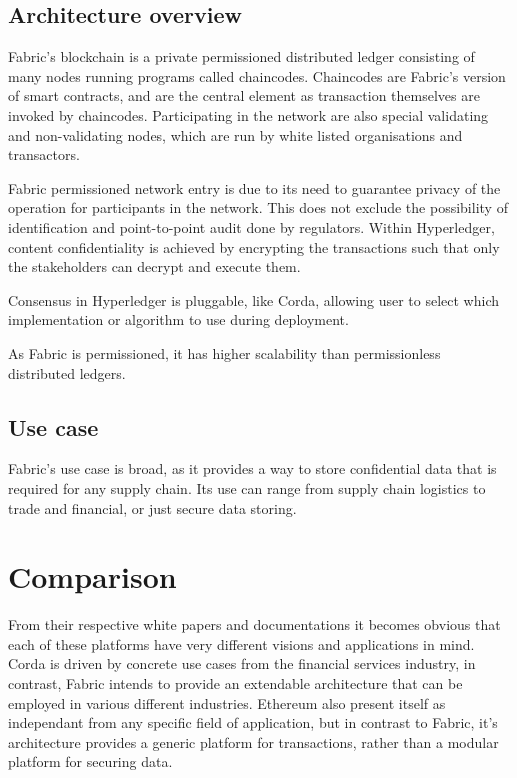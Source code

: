 \subsection{Architecture overview}

Fabric's blockchain is a private permissioned distributed ledger consisting of many nodes running programs called chaincodes. Chaincodes are Fabric's version of smart contracts, and are the central element as transaction themselves are invoked by chaincodes. Participating in the network are also special validating and non-validating nodes, which are run by white listed organisations and transactors. 

Fabric permissioned network entry is due to its need to guarantee privacy of the operation for participants in the network. This does not exclude the possibility of identification and point-to-point audit done by regulators. Within Hyperledger, content confidentiality is achieved by encrypting the transactions such that only the stakeholders can decrypt and execute them.

Consensus in Hyperledger is pluggable, like Corda, allowing user to select which implementation or algorithm to use during deployment. 

As Fabric is permissioned, it has higher scalability than permissionless distributed ledgers.

\subsection{Use case}

Fabric's use case is broad, as it provides a way to store confidential data that is required for any supply chain. Its use can range from supply chain logistics to trade and financial, or just secure data storing.

\section{Comparison}

From their respective white papers and documentations it becomes obvious that each of these platforms have very different visions and applications in mind.
Corda is driven by concrete use cases from the financial services industry, in contrast, Fabric intends to provide an extendable architecture that can be employed in various different industries. Ethereum also present itself as independant from any specific field of application, but in contrast to Fabric, it's architecture provides a generic platform for transactions, rather than a modular platform for securing data.

